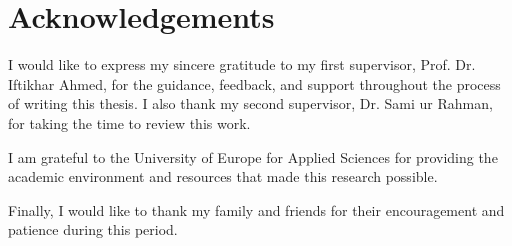 \chapter*{Acknowledgements}

I would like to express my sincere gratitude to my first supervisor, Prof. Dr. Iftikhar Ahmed, for the guidance, feedback, and support throughout the process of writing this thesis. I also thank my second supervisor, Dr. Sami ur Rahman, for taking the time to review this work.

I am grateful to the University of Europe for Applied Sciences for providing the academic environment and resources that made this research possible.

Finally, I would like to thank my family and friends for their encouragement and patience during this period.
